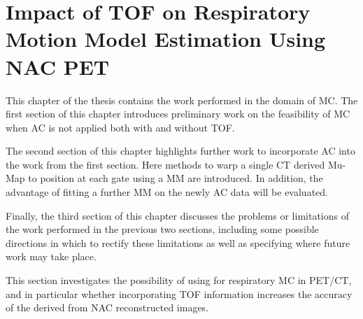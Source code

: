 \chapter{Impact of TOF on Respiratory Motion Model Estimation Using NAC PET} \label{sec:impact_of_tof_on_respiratory_motion_model_estimation_using_nac_pet}
    \newpage
    
        This chapter of the thesis contains the work performed in the domain of \gls{MC}. The first section of this chapter introduces preliminary work on the feasibility of \gls{MC} when \gls{AC} is not applied both with and without \gls{TOF}.
        
        The second section of this chapter highlights further work to incorporate \gls{AC} into the work from the first section. Here methods to warp a single \gls{CT} derived \gls{Mu-Map} to position at each gate using a \gls{MM} are introduced. In addition, the advantage of fitting a further \gls{MM} on the newly \gls{AC} data will be evaluated.
        
        Finally, the third section of this chapter discusses the problems or limitations of the work performed in the previous two sections, including some possible directions in which to rectify these limitations as well as specifying where future work may take place.
    
    
        This section investigates the possibility of using  for respiratory \gls{MC} in \gls{PET}/\gls{CT}, and in particular whether incorporating \gls{TOF} information increases the accuracy of the  derived from \gls{NAC} reconstructed images.
        
